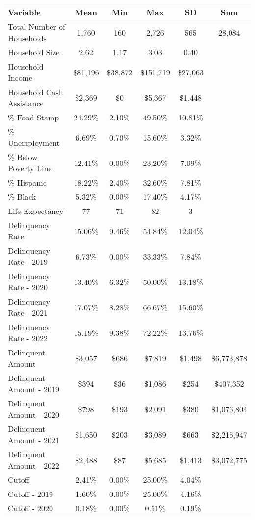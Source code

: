 \begin{tabular}{l|c|c|c|c|c}
\toprule 
\midrule 
Variable & Mean & Min & Max & SD & Sum \\
\midrule 
Total Number of Households & 1,760 & 160 & 2,726 & 565 & 28,084 \\
\quad Household Size & 2.62 & 1.17 & 3.03 & 0.40 \\
Household Income & \$81,196 & \$38,872 & \$151,719 & \$27,063 \\
\quad Household Cash Assistance & \$2,369 & \$0 & \$5,367 & \$1,448 \\
\% Food Stamp & 24.29\% & 2.10\% & 49.50\% & 10.81\% \\
\% Unemployment & 6.69\% & 0.70\% & 15.60\% & 3.32\% \\
\% Below Poverty Line & 12.41\% & 0.00\% & 23.20\% & 7.09\% \\
\% Hispanic & 18.22\% & 2.40\% & 32.60\% & 7.81\% \\
\% Black & 5.32\% & 0.00\% & 17.40\% & 4.17\% \\
Life Expectancy & 77 & 71 & 82 & 3 \\
\midrule 
Delinquency Rate & 15.06\% & 9.46\% & 54.84\% & 12.04\% \\
\quad Delinquency Rate - 2019 & 6.73\% & 0.00\% & 33.33\% & 7.84\% \\
\quad Delinquency Rate - 2020 & 13.40\% & 6.32\% & 50.00\% & 13.18\% \\
\quad Delinquency Rate - 2021 & 17.07\% & 8.28\% & 66.67\% & 15.60\% \\
\quad Delinquency Rate - 2022 & 15.19\% & 9.38\% & 72.22\% & 13.76\% \\
\midrule 
Delinquent Amount & \$3,057 & \$686 & \$7,819 & \$1,498 & \$6,773,878 \\
\quad Delinquent Amount - 2019 & \$394 & \$36 & \$1,086 & \$254 & \$407,352 \\
\quad Delinquent Amount - 2020 & \$798 & \$193 & \$2,091 & \$380 & \$1,076,804 \\
\quad Delinquent Amount - 2021 & \$1,650 & \$203 & \$3,089 & \$663 & \$2,216,947 \\
\quad Delinquent Amount - 2022 & \$2,488 & \$87 & \$5,685 & \$1,413 & \$3,072,775 \\
\midrule 
Cutoff & 2.41\% & 0.00\% & 25.00\% & 4.04\% \\
\quad Cutoff - 2019 & 1.60\% & 0.00\% & 25.00\% & 4.16\% \\
\quad Cutoff - 2020 & 0.18\% & 0.00\% & 0.51\% & 0.19\% \\

\end{tabular}
